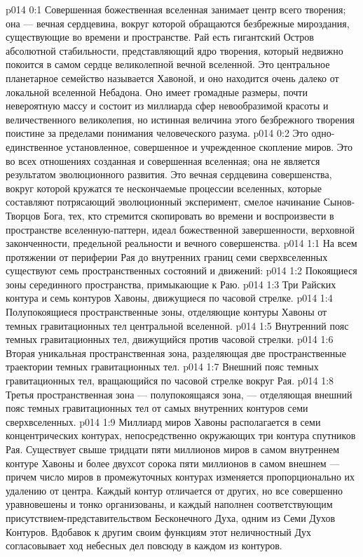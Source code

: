 \author{Совершенствователь Мудрости}
\vs p014 0:1 Совершенная божественная вселенная занимает центр всего творения; она --- вечная сердцевина, вокруг которой обращаются безбрежные мироздания, существующие во времени и пространстве. Рай есть гигантский Остров абсолютной стабильности, представляющий ядро творения, который недвижно покоится в самом сердце великолепной вечной вселенной. Это центральное планетарное семейство называется Хавоной, и оно находится очень далеко от локальной вселенной Небадона. Оно имеет громадные размеры, почти невероятную массу и состоит из миллиарда сфер невообразимой красоты и величественного великолепия, но истинная величина этого безбрежного творения поистине за пределами понимания человеческого разума.
\vs p014 0:2 Это одно\hyp{}единственное установленное, совершенное и учрежденное скопление миров. Это во всех отношениях созданная и совершенная вселенная; она не является результатом эволюционного развития. Это вечная сердцевина совершенства, вокруг которой кружатся те нескончаемые процессии вселенных, которые составляют потрясающий эволюционный эксперимент, смелое начинание Сынов\hyp{}Творцов Бога, тех, кто стремится скопировать во времени и воспроизвести в пространстве вселенную\hyp{}паттерн, идеал божественной завершенности, верховной законченности, предельной реальности и вечного совершенства.
\vs p014 1:1 На всем протяжении от периферии Рая до внутренних границ семи сверхвселенных существуют семь пространственных состояний и движений:
\vs p014 1:2 \bibnobreakspace Покоящиеся зоны серединного пространства, примыкающие к Раю.
\vs p014 1:3 \bibnobreakspace Три Райских контура и семь контуров Хавоны, движущиеся по часовой стрелке.
\vs p014 1:4 \bibnobreakspace Полупокоящиеся пространственные зоны, отделяющие контуры Хавоны от темных гравитационных тел центральной вселенной.
\vs p014 1:5 \bibnobreakspace Внутренний пояс темных гравитационных тел, движущийся против часовой стрелки.
\vs p014 1:6 \bibnobreakspace Вторая уникальная пространственная зона, разделяющая две пространственные траектории темных гравитационных тел.
\vs p014 1:7 \bibnobreakspace Внешний пояс темных гравитационных тел, вращающийся по часовой стрелке вокруг Рая.
\vs p014 1:8 \bibnobreakspace Третья пространственная зона --- полупокоящаяся зона, --- отделяющая внешний пояс темных гравитационных тел от самых внутренних контуров семи сверхвселенных.
\vs p014 1:9 \pc Миллиард миров Хавоны располагается в семи концентрических контурах, непосредственно окружающих три контура спутников Рая. Существует свыше тридцати пяти миллионов миров в самом внутреннем контуре Хавоны и более двухсот сорока пяти миллионов в самом внешнем --- причем число миров в промежуточных контурах изменяется пропорционально их удалению от центра. Каждый контур отличается от других, но все совершенно уравновешены и тонко организованы, и каждый наполнен соответствующим присутствием\hyp{}представительством Бесконечного Духа, одним из Семи Духов Контуров. Вдобавок к другим своим функциям этот неличностный Дух согласовывает ход небесных дел повсюду в каждом из контуров.
